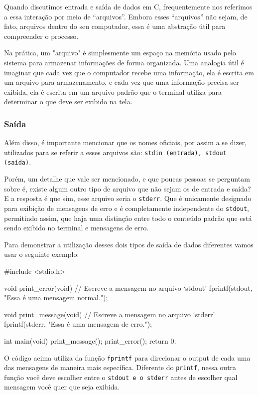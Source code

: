 Quando discutimos entrada e saída de dados em C, frequentemente nos referimos 
a essa interação por meio de ``arquivos''. Embora esses ``arquivos'' não sejam, 
de fato, arquivos dentro do seu computador, essa é uma abstração 
útil para compreender o processo.

\label{o-que-sao-arquivos}Na prática, um "arquivo" é simplesmente um espaço na memória usado pelo 
sistema para armazenar informações de forma organizada. Uma analogia útil é 
imaginar que cada vez que o computador recebe uma informação, ela é escrita em 
um arquivo para armazenamento, e cada vez que uma informação precisa ser 
exibida, ela é escrita em um arquivo padrão que o terminal utiliza para 
determinar o que deve ser exibido na tela.

\subsubsection{Saída}

Além disso, é importante mencionar que os nomes oficiais, por assim a se dizer, 
utilizados para se referir a esses arquivos são: \texttt{stdin (entrada), 
stdout (saída)}.

Porém, um detalhe que vale ser mencionado, e que poucas pessoas se perguntam 
sobre é, existe algum outro tipo de arquivo que não sejam os de entrada e 
saída? E a resposta é que sim, esse arquivo seria o \texttt{stderr}. Que é 
unicamente designado para exibição de mensagens de erro e é completamente 
independente do \texttt{stdout}, permitindo assim, que haja uma distinção 
entre todo o conteúdo padrão que está sendo exibido no terminal e mensagens 
de erro.

Para demonstrar a utilização desses dois tipos de saída de dados diferentes 
vamos usar o seguinte exemplo:

\begin{excode}
    #include <stdio.h>

    void print_error(void)
    {
        // Escreve a mensagem no arquivo `stdout'
        fprintf(stdout, "Essa é uma mensagem normal.");
    }

    void print_message(void)
    {
        // Escreve a mensagem no arquivo `stderr'
        fprintf(stderr, "Essa é uma mensagem de erro.");
    }

    int main(void)
    {
        print_message();
        print_error();
        return 0;
    }
\end{excode}

O código acima utiliza da função \texttt{fprintf} para direcionar o output de 
cada uma das mensagens de maneira mais específica. Diferente do \texttt{printf}, 
nessa outra função você deve escolher entre o \texttt{stdout e o stderr} antes 
de escolher qual mensagem você quer que seja exibida.

